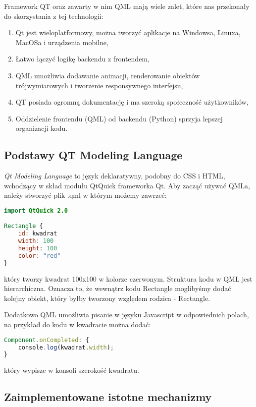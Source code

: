 Framework QT oraz zawarty w nim QML mają wiele zalet, które nas przekonały do skorzystania z tej technologii:
\begin{enumerate}
    \item Qt jest wieloplatformowy, można tworzyć aplikacje na Windowsa, Linuxa, MacOSa i urządzenia mobilne,
    \item Łatwo łączyć logikę backendu z frontendem,
    \item QML umożliwia dodawanie animacji, renderowanie obiektów trójwymiarowych i tworzenie responsywnego interfejsu,
    \item QT posiada ogromną dokumentację i ma szeroką społeczność użytkowników,
    \item Oddzielenie frontendu (QML) od backendu (Python) sprzyja lepszej organizacji kodu.
\end{enumerate}

\subsection{Podstawy QT Modeling Language} 
\label{sec:PodstawyQtModelingLanguage}
\emph{Qt Modeling Language} to język deklaratywny, podobny do CSS i HTML, wchodzący w skład modułu QtQuick frameworka Qt. Aby zacząć używać QMLa, należy stworzyć plik .qml w którym możemy zawrzeć:

\begin{lstlisting}[language=QML, caption={Przykładowy kod QML}]
import QtQuick 2.0

Rectangle {
    id: kwadrat
    width: 100
    height: 100
    color: "red"
}
\end{lstlisting}
który tworzy kwadrat 100x100 w kolorze czerwonym. Struktura kodu w QML jest hierarchiczna. Oznacza to, że wewnątrz kodu Rectangle moglibyśmy dodać kolejny obiekt, który byłby tworzony względem rodzica - Rectangle.

Dodatkowo QML umożliwia pisanie w języku Javascript w odpowiednich polach,
na przykład do kodu w kwadracie można dodać:

\begin{lstlisting}[language=QML, caption={Przykładowy Javascript}]
Component.onCompleted: {
    console.log(kwadrat.width);
}
\end{lstlisting}
który wypisze w konsoli szerokość kwadratu.


\subsection{Zaimplementowane istotne mechanizmy}
\label{sec:ZaimplementowaneIstotneMechanizmy}

